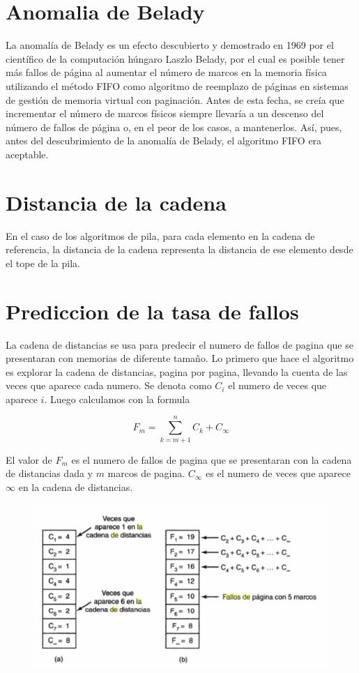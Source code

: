 \documentclass{article}
\begin{document}
{\centering \section*{Anomalia de Belady}}
La anomalía de Belady es un efecto descubierto y demostrado en 1969 por el científico de la computación húngaro Laszlo Belady, por el cual es posible tener más fallos de página al aumentar el número de marcos en la memoria física utilizando el método FIFO como algoritmo de reemplazo de páginas en sistemas de gestión de memoria virtual con paginación. Antes de esta fecha, se creía que incrementar el número de marcos físicos siempre llevaría a un descenso del número de fallos de página o, en el peor de los casos, a mantenerlos. Así, pues, antes del descubrimiento de la anomalía de Belady, el algoritmo FIFO era aceptable.


{\centering \section*{Distancia de la cadena}}
En el caso de los algoritmos de pila, para cada elemento en la cadena de referencia, la distancia de la cadena representa la distancia de ese elemento desde el tope de la pila.


{\centering \section*{Prediccion de la tasa de fallos}}
La cadena de distancias se usa para predecir el numero de fallos de pagina que se presentaran con memorias de diferente tamaño. Lo primero que hace el algoritmo es explorar la cadena de distancias, pagina por pagina, llevando la cuenta de las veces que aparece cada numero. Se denota como $C_{i}$ el numero de veces que aparece $i$. Luego calculamos con la formula 

\begin{equation*}
	F_{m} = \sum_{k=m+1}^{n}C_k + C_\infty
\end{equation*}

El valor de $F_{m}$ es el numero de fallos de pagina que se presentaran con la cadena de distancias dada y $m$ marcos de pagina. $C_\infty$ es el numero de veces que aparece $\infty$ en la cadena de distancias.

\begin{figure}[H]
	\centering
	\includegraphics[scale=1]{img/fallos.png}
\end{figure}
%
%
\end{document}
